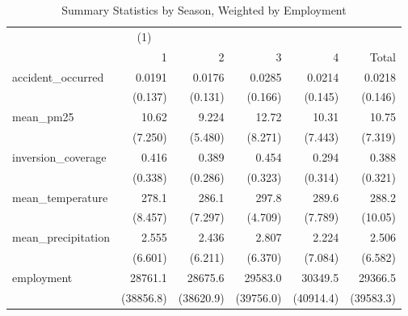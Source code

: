 \begin{table}[htbp]\centering
\caption{Summary Statistics by Season, Weighted by Employment\label{sumstats\_season\_emp\_weighted}}
\begin{tabular}{l*{5}{D{.}{.}{-1}}}
\toprule
                    &&            &            &            &            \\
                    &           1&           2&           3&           4&       Total\\
\midrule
accident\_occurred   &      0.0191&      0.0176&      0.0285&      0.0214&      0.0218\\
                    &     (0.137)&     (0.131)&     (0.166)&     (0.145)&     (0.146)\\
\addlinespace
mean\_pm25           &       10.62&       9.224&       12.72&       10.31&       10.75\\
                    &     (7.250)&     (5.480)&     (8.271)&     (7.443)&     (7.319)\\
\addlinespace
inversion\_coverage  &       0.416&       0.389&       0.454&       0.294&       0.388\\
                    &     (0.338)&     (0.286)&     (0.323)&     (0.314)&     (0.321)\\
\addlinespace
mean\_temperature    &       278.1&       286.1&       297.8&       289.6&       288.2\\
                    &     (8.457)&     (7.297)&     (4.709)&     (7.789)&     (10.05)\\
\addlinespace
mean\_precipitation  &       2.555&       2.436&       2.807&       2.224&       2.506\\
                    &     (6.601)&     (6.211)&     (6.370)&     (7.084)&     (6.582)\\
\addlinespace
employment          &     28761.1&     28675.6&     29583.0&     30349.5&     29366.5\\
                    &   (38856.8)&   (38620.9)&   (39756.0)&   (40914.4)&   (39583.3)\\
\bottomrule
\end{tabular}
\end{table}

